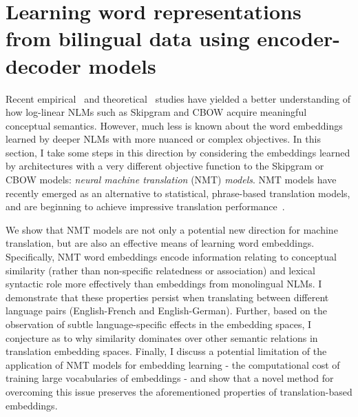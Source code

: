


\section{Learning word representations from bilingual data using encoder-decoder models}

Recent empirical~\citep{baroni2014don,levy2015improving} and theoretical~\citep{levy2014neural} studies have yielded a better understanding of how log-linear NLMs such as Skipgram and CBOW acquire meaningful conceptual semantics. However, much less is known about the word embeddings learned by deeper NLMs with more nuanced or complex objectives. In this section, I take some steps in this direction by considering the embeddings learned by architectures with a very different objective function to the Skipgram or CBOW models: \emph{neural machine translation} (NMT) \emph{models}. NMT models have recently emerged as an alternative to statistical, phrase-based translation models, and are beginning to achieve impressive translation performance~\citep{kalchbrenner13emnlp,devlin2014fast,Sutskever2014sequence}.

We show that NMT models are not only a potential new direction for machine translation, but are also an effective means of learning word embeddings. Specifically, NMT word embeddings encode information relating to conceptual similarity (rather than non-specific relatedness or association) and lexical syntactic role more effectively than embeddings from monolingual NLMs. I demonstrate that these properties persist when translating between different language pairs (English-French and English-German). Further, based on the observation of subtle language-specific effects in the embedding spaces, I conjecture as to why similarity dominates over other semantic relations in translation embedding spaces. Finally, I discuss a potential limitation of the application of NMT models for embedding learning - the computational cost of training large vocabularies of embeddings - and show that a novel method for overcoming this issue preserves the aforementioned properties of translation-based embeddings. 


